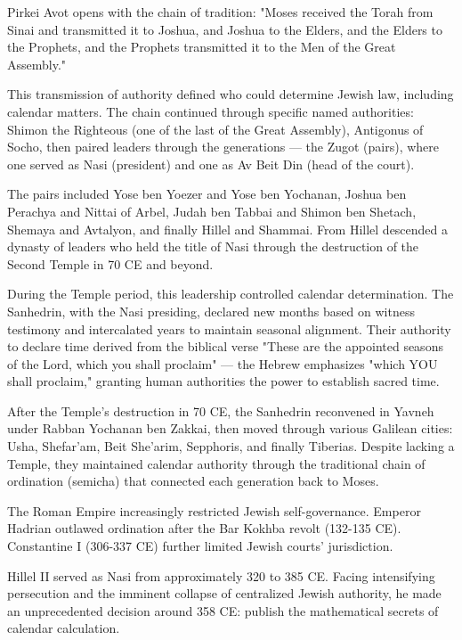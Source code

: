 \begin{historical}
Pirkei Avot opens with the chain of tradition: "Moses received the Torah from Sinai and transmitted it to Joshua, and Joshua to the Elders, and the Elders to the Prophets, and the Prophets transmitted it to the Men of the Great Assembly."

This transmission of authority defined who could determine Jewish law, including calendar matters. The chain continued through specific named authorities: Shimon the Righteous (one of the last of the Great Assembly), Antigonus of Socho, then paired leaders through the generations — the Zugot (pairs), where one served as Nasi (president) and one as Av Beit Din (head of the court).

The pairs included Yose ben Yoezer and Yose ben Yochanan, Joshua ben Perachya and Nittai of Arbel, Judah ben Tabbai and Shimon ben Shetach, Shemaya and Avtalyon, and finally Hillel and Shammai. From Hillel descended a dynasty of leaders who held the title of Nasi through the destruction of the Second Temple in 70 CE and beyond.

During the Temple period, this leadership controlled calendar determination. The Sanhedrin, with the Nasi presiding, declared new months based on witness testimony and intercalated years to maintain seasonal alignment. Their authority to declare time derived from the biblical verse "These are the appointed seasons of the Lord, which you shall proclaim" — the Hebrew emphasizes "which YOU shall proclaim," granting human authorities the power to establish sacred time.

After the Temple's destruction in 70 CE, the Sanhedrin reconvened in Yavneh under Rabban Yochanan ben Zakkai, then moved through various Galilean cities: Usha, Shefar'am, Beit She'arim, Sepphoris, and finally Tiberias. Despite lacking a Temple, they maintained calendar authority through the traditional chain of ordination (semicha) that connected each generation back to Moses.

The Roman Empire increasingly restricted Jewish self-governance. Emperor Hadrian outlawed ordination after the Bar Kokhba revolt (132-135 CE). Constantine I (306-337 CE) further limited Jewish courts' jurisdiction.

Hillel II served as Nasi from approximately 320 to 385 CE. Facing intensifying persecution and the imminent collapse of centralized Jewish authority, he made an unprecedented decision around 358 CE: publish the mathematical secrets of calendar calculation.
\end{historical}